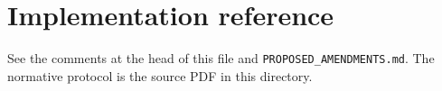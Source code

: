 \documentclass{article}
\begin{document}
\section*{Implementation reference}
See the comments at the head of this file and \texttt{PROPOSED\_AMENDMENTS.md}.
The normative protocol is the source PDF in this directory.
\end{document}
